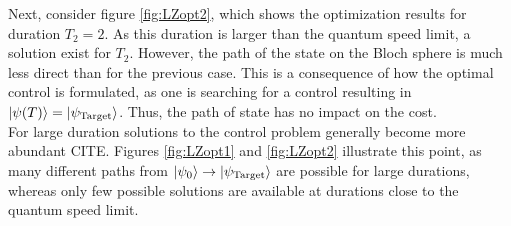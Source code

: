 Next, consider figure \ref{fig:LZopt2}, which shows the optimization results for duration $T_2 =  2$. As this duration is larger than the quantum speed limit, a solution exist for $T_2$. However, the path of the state on the Bloch sphere is much less direct than for the previous case. This is a consequence of how the optimal control is formulated, as one is searching for a control resulting in $\ket{\psi (T)} = \ket{\psi _{\mathrm{Target}}}$. Thus, the path of state has no impact on the cost.\\ For large duration solutions to the control problem generally become more abundant CITE. Figures \ref{fig:LZopt1} and \ref{fig:LZopt2} illustrate this point, as many different paths from $\ket{\psi _0} \to \ket{\psi _{\mathrm{Target}}}$ are possible for large durations, whereas only few possible solutions are available at durations close to the quantum speed limit.